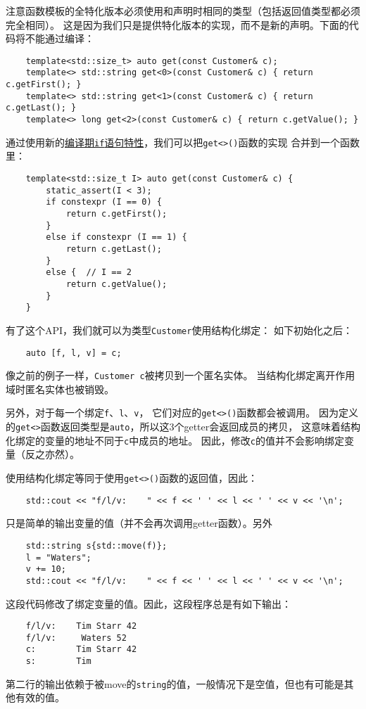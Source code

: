 注意函数模板的全特化版本必须使用和声明时相同的类型（包括返回值类型都必须完全相同）。
这是因为我们只是提供特化版本的实现，而不是新的声明。下面的代码将不能通过编译：
\begin{lstlisting}
    template<std::size_t> auto get(const Customer& c);
    template<> std::string get<0>(const Customer& c) { return c.getFirst(); }
    template<> std::string get<1>(const Customer& c) { return c.getLast(); }
    template<> long get<2>(const Customer& c) { return c.getValue(); }
\end{lstlisting}
通过使用新的\hyperref[ch10]{编译期\texttt{if}语句特性}，我们可以把\texttt{get<>()}函数的实现
\label{编译期if实现get<>}
合并到一个函数里：
\begin{lstlisting}
    template<std::size_t I> auto get(const Customer& c) {
        static_assert(I < 3);
        if constexpr (I == 0) {
            return c.getFirst();
        }
        else if constexpr (I == 1) {
            return c.getLast();
        }
        else {  // I == 2
            return c.getValue();
        }
    }
\end{lstlisting}
有了这个API，我们就可以为类型\texttt{Customer}使用结构化绑定：
如下初始化之后：
\begin{lstlisting}
    auto [f, l, v] = c;
\end{lstlisting}
像之前的例子一样，\texttt{Customer c}被拷贝到一个匿名实体。
当结构化绑定离开作用域时匿名实体也被销毁。

另外，对于每一个绑定\texttt{f}、\texttt{l}、\texttt{v}，
它们对应的\texttt{get<>()}函数都会被调用。
因为定义的\texttt{get<>}函数返回类型是\texttt{auto}，所以这3个getter会返回成员的拷贝，
这意味着结构化绑定的变量的地址不同于\texttt{c}中成员的地址。
因此，修改\texttt{c}的值并不会影响绑定变量（反之亦然）。

使用结构化绑定等同于使用\texttt{get<>()}函数的返回值，因此：
\begin{lstlisting}
    std::cout << "f/l/v:    " << f << ' ' << l << ' ' << v << '\n';
\end{lstlisting}
只是简单的输出变量的值（并不会再次调用getter函数）。另外
\begin{lstlisting}
    std::string s{std::move(f)};
    l = "Waters";
    v += 10;
    std::cout << "f/l/v:    " << f << ' ' << l << ' ' << v << '\n';
\end{lstlisting}
这段代码修改了绑定变量的值。因此，这段程序总是有如下输出：
\begin{lstlisting}
    f/l/v:    Tim Starr 42
    f/l/v:     Waters 52
    c:        Tim Starr 42
    s:        Tim
\end{lstlisting}
第二行的输出依赖于被move的\texttt{string}的值，一般情况下是空值，但也有可能是其他有效的值。

